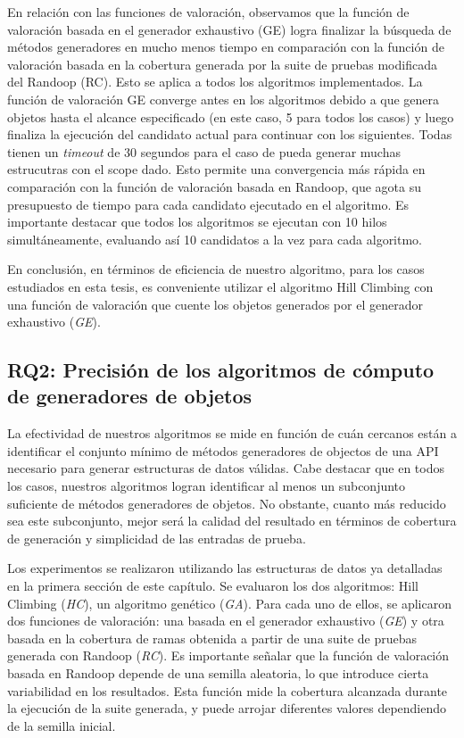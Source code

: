 En relación con las funciones de valoración, observamos que la función de valoración basada en el generador exhaustivo (GE) logra 
finalizar la búsqueda de métodos generadores en mucho menos tiempo en comparación con la función de valoración basada en la 
cobertura generada por la suite de pruebas modificada del Randoop (RC). Esto se aplica a todos los algoritmos implementados. La función 
de valoración GE converge antes en los algoritmos debido a que genera objetos hasta el alcance especificado (en este caso, 5 para todos 
los casos) y luego finaliza la ejecución del candidato actual para continuar con los siguientes. Todas tienen un \emph{timeout} de 
30 segundos para el caso de pueda generar muchas estrucutras con el scope dado. Esto permite una convergencia más rápida en comparación 
con la función de valoración basada en Randoop, que agota su presupuesto de tiempo para cada candidato ejecutado en el algoritmo. Es 
importante destacar que todos los algoritmos se ejecutan con 10 hilos simultáneamente, evaluando así 10 candidatos a la vez para cada 
algoritmo.

En conclusión, en términos de eficiencia de nuestro algoritmo, para los casos estudiados en esta tesis, es conveniente utilizar el 
algoritmo Hill Climbing con una función de valoración que cuente los objetos generados por el generador exhaustivo (\emph{GE}).


\subsection{RQ2: Precisión de los algoritmos de cómputo de generadores de objetos}
\label{sec:experimentalIdentificacionPrecision}
La efectividad de nuestros algoritmos se mide en función de cuán cercanos están a identificar el conjunto mínimo de métodos 
generadores de objectos de una API necesario para generar estructuras de datos válidas. 
Cabe destacar que en todos los casos, nuestros algoritmos 
logran identificar al menos un subconjunto suficiente de métodos generadores de objetos. No obstante, cuanto más reducido sea este 
subconjunto, mejor será la calidad del resultado en términos de cobertura de generación y simplicidad de las entradas de prueba.

Los experimentos se realizaron utilizando las estructuras de datos ya detalladas en la primera sección de este capítulo. Se evaluaron 
los dos algoritmos: Hill Climbing (\emph{HC}), un algoritmo genético (\emph{GA}). Para cada uno de ellos, 
se aplicaron dos funciones de valoración: una basada en el generador exhaustivo 
(\emph{GE}) y otra basada en la cobertura de ramas obtenida a partir de una suite de pruebas generada con Randoop (\emph{RC}).
Es importante señalar que la función de valoración basada en Randoop depende de una semilla aleatoria, lo que introduce cierta 
variabilidad en los resultados. Esta función mide la cobertura alcanzada durante la ejecución de la suite generada, y puede arrojar 
diferentes valores dependiendo de la semilla inicial.

